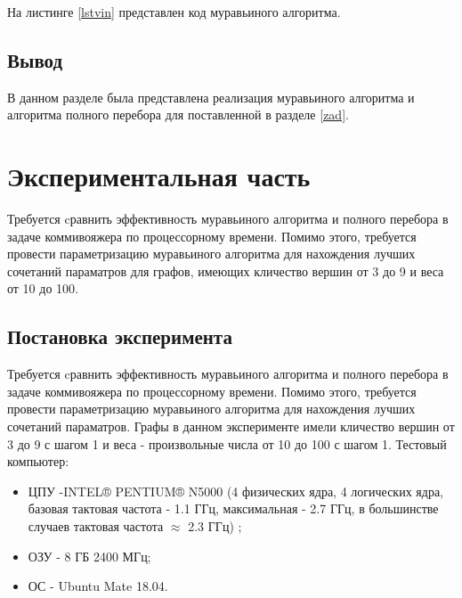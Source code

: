 \documentclass[a4paper, 14pt]{article}
\begin{document}
        

		На листинге \ref{lstvin} представлен код муравьиного алгоритма.
      
        





   \subsection{Вывод} 
   В данном разделе была представлена реализация муравьиного алгоритма и алгоритма полного перебора для поставленной в разделе \ref{zad}.
   \newpage
       	
        \section{Экспериментальная часть}
        Требуется cравнить эффективность муравьиного алгоритма и полного перебора в задаче коммивояжера по процессорному времени. Помимо этого, требуется провести параметризацию муравьиного алгоритма для нахождения лучших сочетаний параматров для графов, имеющих кличество вершин от 3 до 9 и веса от 10 до 100. 
        
		\subsection{Постановка эксперимента}\label{p_exp}
		\parindent=1cm
		
	Требуется cравнить эффективность муравьиного алгоритма и полного перебора в задаче коммивояжера по процессорному времени. Помимо этого, требуется провести параметризацию муравьиного алгоритма для нахождения лучших сочетаний параматров. Графы в данном эксперименте имели кличество вершин от 3 до 9 с шагом 1 и веса - произвольные числа от 10 до 100 с шагом 1.		
		Тестовый компьютер:
		\begin{itemize}
			\item ЦПУ -INTEL® PENTIUM® N5000 (4 физических ядра, 4 логических ядра, базовая тактовая частота - 1.1 ГГц, максимальная - 2.7 ГГц, в большинстве случаев тактовая частота $\approx$ 2.3 ГГц) \cite{intel};
			\item ОЗУ - 8 ГБ 2400 МГц;
			\item ОС - Ubuntu Mate 18.04.
		\end{itemize}
\end{document}
